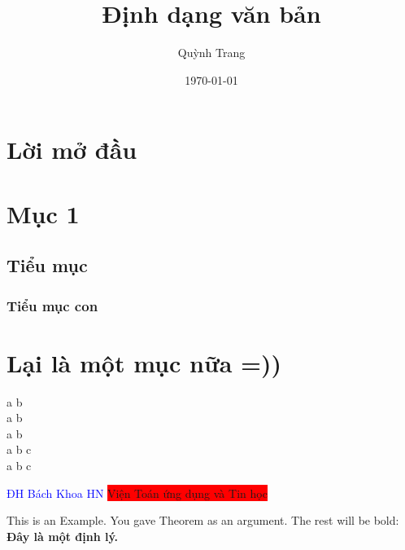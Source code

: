\documentclass[12pt,twoside]{article}
\title{Định dạng văn bản}
\author{Quỳnh Trang}
\date{\today}
\newenvironment{Example}[2][Example]
{This is an #1. You gave #2 as an argument.
The rest will be bold: \bfseries}
{}
\begin{document}
\maketitle
\tableofcontents

\section*{Lời mở đầu}

\section{Mục 1} 
\blindtext

\newpage
\subsection{Tiểu mục}
\blindtext

\subsubsection{Tiểu mục con}
\blindtext

\section{Lại là một mục nữa =))}
\blindtext



\noindent a \quad b\\
a \qquad b\\
a \hspace{2cm} b\\
a \hfil b \hfil c\\
a \hfill b \hfill c

\newpage

\blindtext
\vfill
\blindtext

\newpage

\pagecolor{yellow!30!}
\textcolor{blue}{ĐH Bách Khoa HN}
\colorbox{red}{Viện Toán ứng dụng và Tin học}\\



\begin{Example}{Theorem}
	Đây là một định lý. 
\end{Example}
\end{document}

